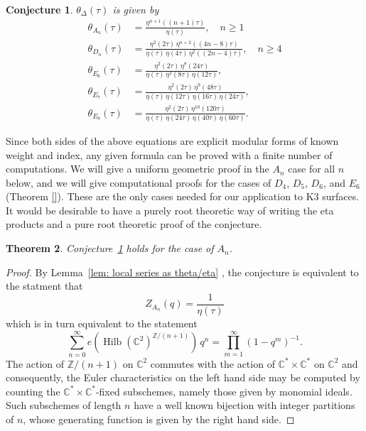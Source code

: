 \documentclass{article}
\newtheorem{theorem}{Theorem}%
\newtheorem{conjecture}[theorem]{Conjecture}
\theoremstyle{definition}
\newcommand{\CC} {{\mathbb C}}          %
\newcommand{\ZZ} {{\mathbb Z}}		%
\newcommand{\Hilb}{\operatorname{Hilb}}
\begin{document}
\begin{conjecture}\label{conj: eta product for theta function}
$\theta_{\Delta}(\tau )$ is given by
\begin{align}\label{eqn: theta function eta products}
\theta_{A_{n}}(\tau ) &= \frac{\eta^{n+1}((n+1)\tau )}{\eta (\tau )} ,\quad n\geq 1\\
\theta_{D_{n}}(\tau ) &= \frac{\eta^{2}(2\tau )\,  \eta^{n+2}((4n-8)\tau )}{\eta (\tau )\,  \eta (4\tau )\,  \eta^{2}((2n-4)\tau )} ,\quad n\geq 4\\
\theta_{E_{6}}(\tau ) & = \frac{\eta^{2}(2\tau )\, \eta^{8}(24\tau
)}{\eta (\tau )\, \eta^{2}(8\tau )\, \eta (12\tau )} ,\\
\theta_{E_{7}}(\tau ) & = \frac{\eta^{2}(2\tau )\, \eta^{9}(48\tau
)}{\eta (\tau )\, \eta(12\tau )\, \eta(16\tau )\, \eta (24\tau )} ,\\
\theta_{E_{8}}(\tau ) & = \frac{\eta^{2}(2\tau )\, \eta^{10}(120\tau
)}{\eta (\tau )\, \eta(24\tau )\, \eta(40\tau )\, \eta (60\tau )}.
\end{align}
\end{conjecture}

Since both sides of the above equations are explicit modular forms of known
weight and index, any given formula can be proved with a finite number
of computations. We will give a uniform geometric proof in the $A_{n}$ case for
all $n$ below, and we will give computational proofs for the cases of
$D_{4}$, $D_{5}$, $D_{6}$, and $E_{6}$ (Theorem \ref{}). These are the only cases needed
for our application to K3 surfaces. It would be desirable to have a
purely root theoretic way of writing the eta products and a pure root
theoretic proof of the conjecture. 

\begin{theorem}\label{thm: conjecture holds for An}
Conjecture~\ref{conj: eta product for theta function} holds for the
case of $A_{n}$. 
\end{theorem}

\begin{proof}
By Lemma~\ref{lem: local series as theta/eta} , the conjecture is
equivalent to the statment that 
\[
Z_{A_{n}}(q) = \frac{1}{\eta (\tau )}
\]
which is in turn equivalent to the statement
\[
\sum_{n=0}^{\infty} e\left(\Hilb (\CC^{2})^{\ZZ /(n+1)} \right)
\,q^{n} = \prod_{m=1}^{\infty} (1-q^{m})^{-1}.
\]
The action of $\ZZ /(n+1)$ on $\CC^{2}$ commutes with the action of
$\CC^{*}\times \CC^{*}$ on $\CC^{2}$ and consequently, the Euler
characteristics on the left hand side may be computed by counting
the $\CC^{*}\times \CC^{*}$-fixed subschemes, namely those given by
monomial ideals. Such subschemes of length $n$ have a well known
bijection with integer partitions of $n$, whose generating function is
given by the right hand side.
\end{proof}
\end{document}
